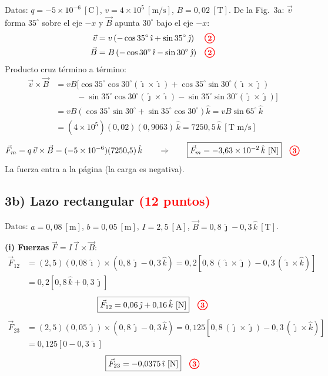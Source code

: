 \documentclass[12pt,letterpaper]{article}
\newcommand{\pts}[1]{\tikz[baseline=(c.base)]\node[circle,draw=red,text=red,thick,inner sep=1.3pt,font=\small\bfseries](c){#1};}
\begin{document}
Datos: $q = -5\times10^{-6}\ [\text{C}]$, $v = 4\times10^{5}\ [\text{m/s}]$, $B = 0{,}02\ [\text{T}]$.
De la Fig.~3a: $\vec{v}$ forma $35^\circ$ sobre el eje $-x$ y $\vec{B}$ apunta $30^\circ$ bajo el eje $-x$:
\begin{align*}
    \vec{v} &= v\left(-\cos35^\circ\,\hat{\imath} + \sin35^\circ\,\hat{\jmath}\right) && \pts{2}\\
    \vec{B} &= B\left(-\cos30^\circ\,\hat{\imath} - \sin30^\circ\,\hat{\jmath}\right) && \pts{2}
\end{align*}
Producto cruz t\'ermino a t\'ermino:
\begin{align*}
    \vec{v}\times\vec{B}
      &= vB\bigl[\cos35^\circ\cos30^\circ(\hat{\imath}\times\hat{\imath})
         + \cos35^\circ\sin30^\circ(\hat{\imath}\times\hat{\jmath})\\
      &\qquad\;\; - \sin35^\circ\cos30^\circ(\hat{\jmath}\times\hat{\imath})
         - \sin35^\circ\sin30^\circ(\hat{\jmath}\times\hat{\jmath})\bigr]\\
      &= vB\left(\cos35^\circ\sin30^\circ + \sin35^\circ\cos30^\circ\right)\hat{k}
       = vB\sin65^\circ\,\hat{k}\\
      &= (4\times10^{5})(0{,}02)(0{,}9063)\,\hat{k} = 7250{,}5\,\hat{k}\ [\text{T m/s}]
\end{align*}
\[
    \vec{F}_m = q\,\vec{v}\times\vec{B} = (-5\times10^{-6})(7250{,}5)\,\hat{k}
    \qquad\Rightarrow\qquad
    \boxed{\vec{F}_m = -3{,}63\times10^{-2}\,\hat{k}\ [\text{N}]} \quad\pts{3}
\]
La fuerza entra a la p\'agina (la carga es negativa).

\subsection*{3b) Lazo rectangular \quad\textcolor{red}{(12 puntos)}}

Datos: $a = 0{,}08\ [\text{m}]$, $b = 0{,}05\ [\text{m}]$, $I = 2{,}5\ [\text{A}]$,
$\vec{B} = 0{,}8\,\hat{\jmath} - 0{,}3\,\hat{k}\ [\text{T}]$.

\textbf{(i) Fuerzas} $\vec{F} = I\,\vec{l}\times\vec{B}$:
\begin{align*}
    \vec{F}_{12} &= (2{,}5)(0{,}08\,\hat{\imath})\times(0{,}8\,\hat{\jmath} - 0{,}3\,\hat{k})
                  = 0{,}2\left[0{,}8\,(\hat{\imath}\times\hat{\jmath}) - 0{,}3\,(\hat{\imath}\times\hat{k})\right]\\
                 &= 0{,}2\left[0{,}8\,\hat{k} + 0{,}3\,\hat{\jmath}\right]
\end{align*}
\[
    \boxed{\vec{F}_{12} = 0{,}06\,\hat{\jmath} + 0{,}16\,\hat{k}\ [\text{N}]} \quad\pts{3}
\]
\begin{align*}
    \vec{F}_{23} &= (2{,}5)(0{,}05\,\hat{\jmath})\times(0{,}8\,\hat{\jmath} - 0{,}3\,\hat{k})
                  = 0{,}125\left[0{,}8\,(\hat{\jmath}\times\hat{\jmath}) - 0{,}3\,(\hat{\jmath}\times\hat{k})\right]\\
                 &= 0{,}125\left[0 - 0{,}3\,\hat{\imath}\right]
\end{align*}
\[
    \boxed{\vec{F}_{23} = -0{,}0375\,\hat{\imath}\ [\text{N}]} \quad\pts{3}
\]
\end{document}

